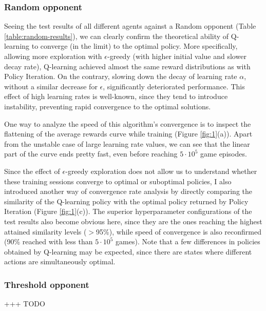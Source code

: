\subsubsection{Random opponent}

Seeing the test results of all different agents against a Random opponent (Table \ref{table:random-results}), we can clearly confirm the theoretical ability of Q-learning to converge (in the limit) to the optimal policy. More specifically, allowing more exploration with $\epsilon$-greedy (with higher initial value and slower decay rate), Q-learning achieved almost the same reward distributions as with Policy Iteration. On the contrary, slowing down the decay of learning rate $\alpha$, without a similar decrease for $\epsilon$, significantly deteriorated performance. This effect of high learning rates is well-known, since they tend to introduce instability, preventing rapid convergence to the optimal solutions.

One way to analyze the speed of this algorithm's convergence is to inspect the flattening of the average rewards curve while training (Figure \ref{fig:1}(a)). Apart from the unstable case of large learning rate values, we can see that the linear part of the curve ends pretty fast, even before reaching $5\cdot10^5$ game episodes. 

Since the effect of $\epsilon$-greedy exploration does not allow us to understand whether these training sessions converge to optimal or suboptimal policies, I also introduced another way of convergence rate analysis by directly comparing the similarity of the Q-learning policy with the optimal policy returned by Policy Iteration (Figure \ref{fig:1}(c)). The superior hyperparameter configurations of the test results also become obvious here, since they are the ones reaching the highest attained similarity levels ($>$95\%), while speed of convergence is also reconfirmed (90\% reached with less than $5\cdot10^5$ games). Note that a few differences in policies obtained by Q-learning may be expected, since there are states where different actions are simultaneously optimal.

\subsubsection{Threshold opponent}

+++ TODO


